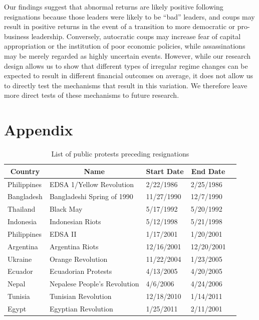 \documentclass[12pt,final,fleqn]{article}
\theoremstyle{plain}
\begin{document}
Our findings suggest that abnormal returns are likely positive following resignations because those leaders were likely to be ``bad'' leaders, and coups may result in positive returns in the event of a transition to more democratic or pro-business leadership. Conversely, autocratic coups may increase fear of capital appropriation or the institution of poor economic policies, while assassinations may be merely regarded as highly uncertain events. However, while our research design allows us to show that different types of irregular regime changes can be expected to result in different financial outcomes on average, it does not allow us to directly test the mechanisms that result in this variation. We therefore leave more direct tests of these mechanisms to future research. 

\newpage

\appendix
\setcounter{table}{0}
\renewcommand\thetable{\Alph{section}.\arabic{table}}
\setcounter{figure}{0}
\renewcommand{\thefigure}{A\arabic{figure}}

\section{Appendix} \label{Appendix}
\begin{table}[!ht]
\caption{List of public protests preceding resignations} \label{tab:protest-list}
\vspace{-5pt}
\footnotesize
\begin{center}
\begin{threeparttable}
\begin{tabular*}{\textwidth}{l@{\extracolsep{\fill}}llll}
  \hline
    \hline
\multicolumn{1}{c}{Country}&\multicolumn{1}{c}{Name}&\multicolumn{1}{c}{Start Date}&\multicolumn{1}{c}{End Date}\\
  \hline
Philippines & EDSA 1/Yellow Revolution & 2/22/1986 & 2/25/1986\\
Bangladesh & Bangladeshi Spring of 1990 & 11/27/1990 & 12/7/1990\\
Thailand & Black May & 5/17/1992 & 5/20/1992\\
Indonesia & Indonesian Riots & 5/12/1998 & 5/21/1998\\
Philippines & EDSA II & 1/17/2001 & 1/20/2001\\
Argentina & Argentina Riots & 12/16/2001 & 12/20/2001\\
Ukraine & Orange Revolution & 11/22/2004 & 1/23/2005\\
Ecuador & Ecuadorian Protests & 4/13/2005 & 4/20/2005\\
Nepal & Nepalese People's Revolution & 4/6/2006 & 4/24/2006\\
Tunisia & Tunisian Revolution & 12/18/2010 & 1/14/2011\\
Egypt & Egyptian Revolution & 1/25/2011 & 2/11/2001\\
   \hline
   \hline
\end{tabular*}
\scriptsize
\end{threeparttable}
\end{center}
\end{table}
\end{document}
